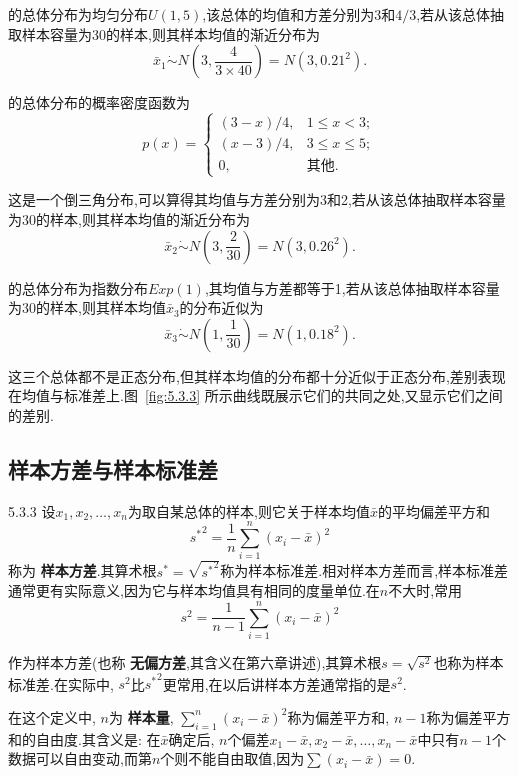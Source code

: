 \begin{example}
的总体分布为均匀分布$U(1,5)$,该总体的均值和方差分别为$3$和$4/3$,若从该总体抽取样本容量为30的样本,则其样本均值的渐近分布为
\[\bar x_1\dot{\sim}N\left(3,\frac4{3\times40}\right)=N(3,0.21^2).\]

的总体分布的概率密度函数为
\[p(x)=\begin{cases}
(3-x)/4,&1\leq x<3;\\
(x-3)/4,&3\leq x\leq 5;\\
0,&\text{其他}.
\end{cases}\]

这是一个倒三角分布,可以算得其均值与方差分别为3和2,若从该总体抽取样本容量为30的样本,则其样本均值的渐近分布为
\[\bar x_2\dot{\sim} N\left(3,\frac{2}{30}\right)=N(3,0.26^2).\]

的总体分布为指数分布$Exp(1)$,其均值与方差都等于1,若从该总体抽取样本容量为30的样本,则其样本均值$\bar x_3$的分布近似为
\[\bar x_3\dot{\sim}N\left(1,\frac1{30}\right)=N(1,0.18^2).\]

这三个总体都不是正态分布,但其样本均值的分布都十分近似于正态分布,差别表现在均值与标准差上.图~\ref{fig:5.3.3} 所示曲线既展示它们的共同之处,又显示它们之间的差别.
\end{example}
\subsection{样本方差与样本标准差\label{ssec:5.3.3}}
\begin{definition}{}{5.3.3}
设$x_1,x_2,\dotsc,x_n$为取自某总体的样本,则它关于样本均值$\bar x$的平均偏差平方和
\begin{equation}\label{eq:5.3.3}
{s^\ast}^2=\frac1n\sum_{i=1}^n(x_i-\bar x)^2
\end{equation}
称为 \textbf{样本方差}.其算术根$s^\ast=\sqrt{{s^\ast}^2}$称为样本标准差.相对样本方差而言,样本标准差通常更有实际意义,因为它与样本均值具有相同的度量单位.在$n$不大时,常用
\begin{equation}\label{eq:5.3.4}
s^2=\frac1{n-1}\sum_{i=1}^n(x_i-\bar x)^2
\end{equation}

作为样本方差(也称 \textbf{无偏方差},其含义在第六章讲述),其算术根$s=\sqrt{s^2}$也称为样本标准差.在实际中, $s^2$比${s^\ast}^2$更常用,在以后讲样本方差通常指的是$s^2$.
\end{definition}

在这个定义中, $n$为 \textbf{样本量}, $\sum_{i=1}^n(x_i-\bar x)^2$称为偏差平方和, $n-1$称为偏差平方和的自由度.其含义是: 在$\bar x$确定后, $n$个偏差$x_1-\bar x,x_2-\bar x,\dotsc,x_n-\bar x$中只有$n-1$个数据可以自由变动,而第$n$个则不能自由取值,因为$\sum(x_i-\bar x)=0$.

